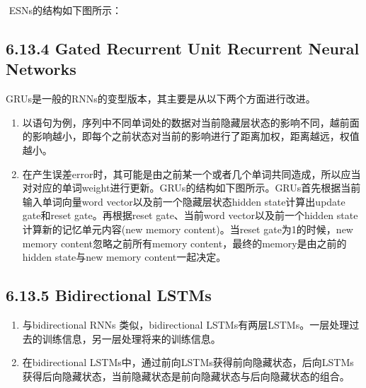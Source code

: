 ​ ESNs的结构如下图所示：


\subsection{6.13.4 Gated Recurrent Unit Recurrent Neural
Networks}\label{gated-recurrent-unit-recurrent-neural-networks}

GRUs是一般的RNNs的变型版本，其主要是从以下两个方面进行改进。

\begin{enumerate}
\def\labelenumi{\arabic{enumi}.}
\item
  以语句为例，序列中不同单词处的数据对当前隐藏层状态的影响不同，越前面的影响越小，即每个之前状态对当前的影响进行了距离加权，距离越远，权值越小。
\item
  在产生误差error时，其可能是由之前某一个或者几个单词共同造成，所以应当对对应的单词weight进行更新。GRUs的结构如下图所示。GRUs首先根据当前输入单词向量word
  vector以及前一个隐藏层状态hidden state计算出update gate和reset
  gate。再根据reset gate、当前word vector以及前一个hidden
  state计算新的记忆单元内容(new memory content)。当reset
  gate为1的时候，new memory content忽略之前所有memory
  content，最终的memory是由之前的hidden state与new memory
  content一起决定。
\end{enumerate}


\subsection{6.13.5 Bidirectional LSTMs}\label{bidirectional-lstms}

\begin{enumerate}
\def\labelenumi{\arabic{enumi}.}
\item
  与bidirectional RNNs 类似，bidirectional
  LSTMs有两层LSTMs。一层处理过去的训练信息，另一层处理将来的训练信息。
\item
  在bidirectional
  LSTMs中，通过前向LSTMs获得前向隐藏状态，后向LSTMs获得后向隐藏状态，当前隐藏状态是前向隐藏状态与后向隐藏状态的组合。
\end{enumerate}

